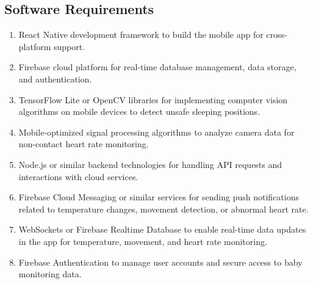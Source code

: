 \documentclass[12pt,a4paper]{report}
\begin{document}
\subsection*{Software Requirements}
\begin{enumerate}
    \item React Native development framework to build the mobile app for cross-platform support.
    \item Firebase cloud platform for real-time database management, data storage, and authentication.
    \item TensorFlow Lite or OpenCV libraries for implementing computer vision algorithms\cite{10187295} on mobile devices to detect unsafe sleeping positions\cite{8300133}\cite{9292052}.
    \item Mobile-optimized signal processing algorithms\cite{8575335} to analyze camera data for non-contact heart rate monitoring\cite{7177484}\cite{10226197}.
    \item Node.js or similar backend technologies for handling API requests and interactions with cloud services.
    \item Firebase Cloud Messaging or similar services for sending push notifications related to temperature changes, movement detection, or abnormal heart rate.
    \item WebSockets or Firebase Realtime Database to enable real-time data updates in the app for temperature, movement, and heart rate monitoring.
    \item Firebase Authentication to manage user accounts and secure access to baby monitoring data.
\end{enumerate}
\newpage
\pagestyle{plain}
\renewcommand{\bibname}{References}

\printbibliography





\end{document}
